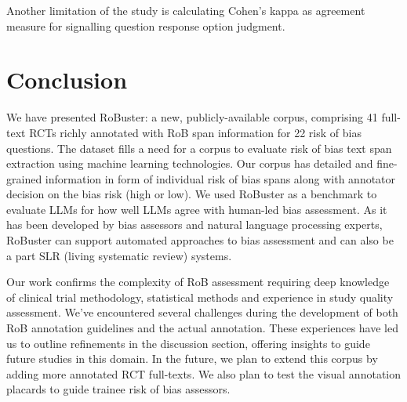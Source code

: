 \documentclass[sn-mathphys,Numbered]{sn-jnl}%
\theoremstyle{thmstyleone}%
\theoremstyle{thmstyletwo}%
\theoremstyle{thmstylethree}%
\begin{document}
Another limitation of the study is calculating Cohen's kappa as agreement measure for signalling question response option judgment. %

%
%
%
\section{Conclusion}
\label{sec:conclusion}
%
We have presented RoBuster: a new, publicly-available corpus, comprising 41 full-text RCTs richly annotated with RoB span information for 22 risk of bias questions.
The dataset fills a need for a corpus to evaluate risk of bias text span extraction using machine learning technologies.
Our corpus has detailed and fine-grained information in form of individual risk of bias spans along with annotator decision on the bias risk (high or low).
We used RoBuster as a benchmark to evaluate LLMs for how well LLMs agree with human-led bias assessment.
As it has been developed by bias assessors and natural language processing experts, RoBuster can support automated approaches to bias assessment and can also be a part SLR (living systematic review) systems.


Our work confirms the complexity of RoB assessment requiring deep knowledge of clinical trial methodology, statistical methods and experience in study quality assessment.
We've encountered several challenges during the development of both RoB annotation guidelines and the actual annotation.
These experiences have led us to outline refinements in the discussion section, offering insights to guide future studies in this domain.
In the future, we plan to extend this corpus by adding more annotated RCT full-texts.
We also plan to test the visual annotation placards to guide trainee risk of bias assessors.
%
%
%
\end{document}
